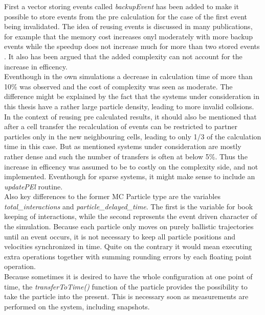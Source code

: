 First a vector storing events called \textit{backupEvent} has been added to make it possible to store events from the pre calculation for the case of the first event being invalidated. The idea of reusing events is discussed in many publications, for example that the memory cost increases onyl moderately with more backup events while the speedup does not increase much for more than two stored events \cite{Bannerman2011}. It also has been argued that the added complexity can not account for the increase in efficency\cite{DONEV2005}.\\ 
Eventhough in the own simulations a decrease in calculation time of more than 10\% was observed and the cost of complexity was seen as moderate. The difference might be explained by the fact that the systems under consideration in this thesis have a rather large particle density, leading to more invalid collsions.\\

In the context of reusing pre calculated results, it should also be mentioned that after a cell transfer the recalculation of events can be restricted to partner particles only in the new neighbouring cells, leading to only 1/3 of the calculation time in this case. But as mentioned systems under consideration are mostly rather dense and such the number of transfers is often at below 5\%. Thus the increase in efficency was assumed to be to costly on the complexity side, and not implemented. Eventhough for sparse systems, it might make sense to include an \textit{updatePEl} routine.\\


Also key differences to the former MC Particle type are the variables \textit{total\_interactions} and \textit{particle\_delayed\_time}. The first is the variable for book keeping of interactions, while the second represents the event driven character of the simulation. Because each particle only moves on purely ballistic trajectories until an event occurs, it is not necessary to keep all particle positions and velocities synchronized in time. Quite on the contrary it would mean executing extra operations together with summing rounding errors by each floating point operation.\\

Because sometimes it is desired to have the whole configuration at one point of time, the \textit{transferToTime()} function of the particle provides the possibility to take the particle into the present. This is necessary soon as measurements are performed on the system, including snapshots.\\

